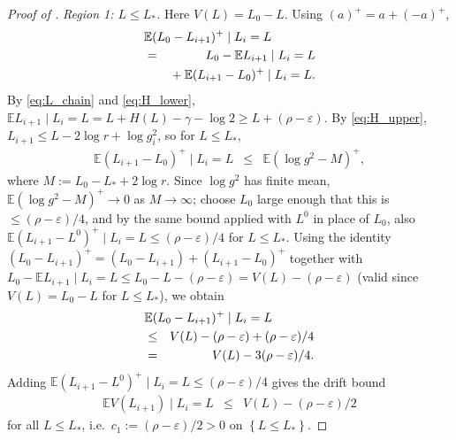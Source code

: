 \documentclass{article}
\newcommand{\Set}[1]{\left\{ #1 \right\}}
\newcommand{\Exp}[1]{\mathbb{E} #1}
\newcommand{\cond}{\mid}
\newcommand{\eps}{\varepsilon}
\begin{document}
\begin{proof}[Proof of ]
  \emph{Region 1: $L \le L_*$.} Here $V(L) = L_0 - L$. Using $(a)^+ = a + (-a)^+$,
  \begin{eqnarray*}
    \lefteqn{\Exp{(L_0 - L_{i+1})^+ \cond L_i = L}} \\
    & = & L_0 - \Exp{L_{i+1} \cond L_i = L} \\
    & & {}+ \Exp{(L_{i+1} - L_0)^+ \cond L_i = L}.
  \end{eqnarray*}
  By \eqref{eq:L_chain} and \eqref{eq:H_lower}, $\Exp{L_{i+1} \cond L_i = L} = L + H(L) - \gamma - \log 2 \ge L + (\rho - \eps)$. By \eqref{eq:H_upper}, $L_{i+1} \le L - 2\log r + \log g_i^2$, so for $L \le L_*$,
  \begin{eqnarray*}
    \Exp{(L_{i+1} - L_0)^+ \cond L_i = L} & \le & \Exp{(\log g^2 - M)^+},
  \end{eqnarray*}
  where $M := L_0 - L_* + 2\log r$.
  Since $\log g^2$ has finite mean, $\Exp{(\log g^2 - M)^+} \to 0$ as $M \to \infty$; choose $L_0$ large enough that this is $\le (\rho - \eps)/4$, and by the same bound applied with $L^0$ in place of $L_0$, also $\Exp{(L_{i+1} - L^0)^+ \cond L_i = L} \le (\rho - \eps)/4$ for $L \le L_*$. Using the identity $(L_0 - L_{i+1})^+ = (L_0 - L_{i+1}) + (L_{i+1} - L_0)^+$ together with $L_0 - \Exp{L_{i+1} \cond L_i = L} \le L_0 - L - (\rho - \eps) = V(L) - (\rho - \eps)$ (valid since $V(L) = L_0 - L$ for $L \le L_*$), we obtain
  \begin{eqnarray*}
    \lefteqn{\Exp{(L_0 - L_{i+1})^+ \cond L_i = L}} \\
    & \le & V(L) - (\rho - \eps) + (\rho - \eps)/4 \\
    & = & V(L) - 3(\rho - \eps)/4.
  \end{eqnarray*}
  Adding $\Exp{(L_{i+1} - L^0)^+ \cond L_i = L} \le (\rho - \eps)/4$ gives the drift bound
  \begin{eqnarray}
    \label{eq:drift_left}
    \Exp{V(L_{i+1}) \cond L_i = L} & \le & V(L) - (\rho - \eps)/2
  \end{eqnarray}
  for all $L \le L_*$, i.e.\ $c_1 := (\rho - \eps)/2 > 0$ on $\Set{L \le L_*}$.


\end{proof}
\end{document}
